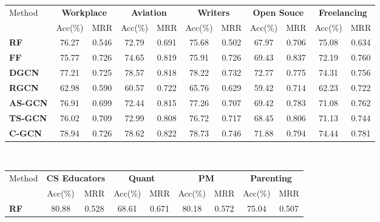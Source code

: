 \documentclass[smallcondensed]{svjour3}     %
\begin{document}
\begin{table}[h]
  \centering
  \begin{tabular}{l|c c|c c|c c|c c|c c}
     \toprule
     \multirow{2}{*}{Method} &
        \multicolumn{2}{c}{\textbf{Workplace}} &
       \multicolumn{2}{c}{\textbf{Aviation}} &
       \multicolumn{2}{c}{\textbf{Writers}} &
       \multicolumn{2}{c}{\textbf{Open Souce}} &
       \multicolumn{2}{c}{\textbf{Freelancing}}\\
       &{Acc(\%)} & {MRR}&{Acc(\%)} & {MRR}&{Acc(\%)}& {MRR}&{Acc(\%)} & {MRR}&{Acc(\%)} & {MRR}\\
       \midrule
       \textbf{RF~\cite{BurelMA16,TianZL13}}&76.27&0.546&72.79&0.691&75.68&0.502&67.97&0.706&75.08&0.634\\

\textbf{FF~\cite{JendersKN16}}&75.77&0.726&74.65&0.819&75.91&0.726&69.43&0.837&72.19&0.760\\

\textbf{DGCN~\cite{DualGCN}}&77.21&0.725&78.57&0.818&78.22&0.732&72.77&0.775&74.31&0.756\\

\textbf{RGCN~\cite{relationalGCN}}&62.98&0.590&60.57&0.722&65.76&0.629&59.42&0.714&62.23&0.722\\
      \cmidrule(lr){1-1}\cmidrule(lr){2-11}
      \textbf{AS-GCN}&76.91&0.699&72.44&0.815&77.26&0.707&69.42&0.783&71.08&0.762\\

\textbf{TS-GCN}&76.02&0.709&72.99&0.808&76.72&0.717&68.45&0.806&71.13&0.744\\

\textbf{C-GCN}&78.94&0.726&78.62&0.822&78.73&0.746&71.88&0.794&74.44&0.781\\
     \bottomrule
   \end{tabular}\\
   \begin{tabular}{l|c c|c c|c c|c c}
      \toprule
      \multirow{2}{*}{Method} &
         \multicolumn{2}{c}{\textbf{CS Educators}} &
        \multicolumn{2}{c}{\textbf{Quant}} &
        \multicolumn{2}{c}{\textbf{PM}} &
        \multicolumn{2}{c}{\textbf{Parenting}} \\
        &{Acc(\%)} & {MRR}&{Acc(\%)} & {MRR}&{Acc(\%)}& {MRR}&{Acc(\%)} & {MRR}\\
        \midrule
        \textbf{RF~\cite{BurelMA16,TianZL13}}&80.88&0.528&68.61&0.671&80.18&0.572&75.04&0.507\\


\end{tabular}
\end{table}
\end{document}
